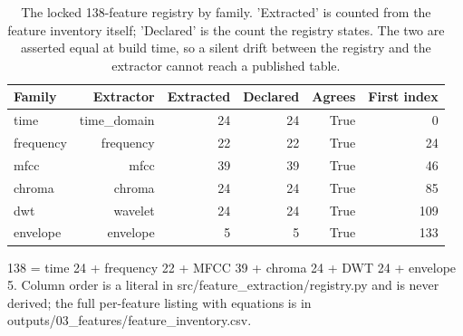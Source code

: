 \begin{table}[htbp]
  \centering
  \caption{The locked 138-feature registry by family. 'Extracted' is counted from the feature inventory itself; 'Declared' is the count the registry states. The two are asserted equal at build time, so a silent drift between the registry and the extractor cannot reach a published table.}
  \label{tab:t05}
  \begin{tabular}{lrrrrr}
    \toprule
    Family & Extractor & Extracted & Declared & Agrees & First index \\
    \midrule
    time & time\_domain & 24 & 24 & True & 0 \\
    frequency & frequency & 22 & 22 & True & 24 \\
    mfcc & mfcc & 39 & 39 & True & 46 \\
    chroma & chroma & 24 & 24 & True & 85 \\
    dwt & wavelet & 24 & 24 & True & 109 \\
    envelope & envelope & 5 & 5 & True & 133 \\
    \bottomrule
  \end{tabular}
  \par\footnotesize 138 = time 24 + frequency 22 + MFCC 39 + chroma 24 + DWT 24 + envelope 5. Column order is a literal in src/feature\_extraction/registry.py and is never derived; the full per-feature listing with equations is in outputs/03\_features/feature\_inventory.csv.
\end{table}
